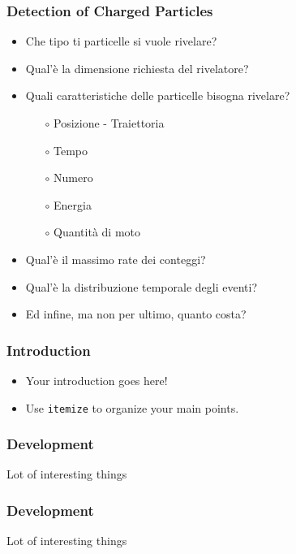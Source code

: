 \documentclass[notes]{beamer}       			%
\begin{document}
\begin{frame}
	\frametitle{Detection of Charged Particles}
	\begin{itemize}
	\item	Che tipo ti particelle si vuole rivelare?
	\item	Qual'è la dimensione richiesta del rivelatore?
	\item	Quali caratteristiche delle particelle bisogna rivelare?
	\begin{itemize}
		\item[$\circ$]	Posizione - Traiettoria
		\item[$\circ$]	Tempo
		\item[$\circ$]	Numero
		\item[$\circ$]	Energia
		\item[$\circ$]	Quantità di moto
	\end{itemize}
	\item	Qual'è il massimo rate dei conteggi?
	\item	Qual'è la distribuzione temporale degli eventi?
	\item	Ed infine, ma non per ultimo, quanto costa? 
	\end{itemize}
\end{frame}

\begin{frame}
    \frametitle{Introduction}

\begin{itemize}
  \item Your introduction goes here!
  \item Use \texttt{itemize} to organize your main points.
\end{itemize}

\end{frame}


\begin{frame}
    \frametitle{Development}

    Lot of interesting things

\end{frame}


\begin{frame}
    \frametitle{Development}

    Lot of interesting things

\end{frame}
\end{document}
